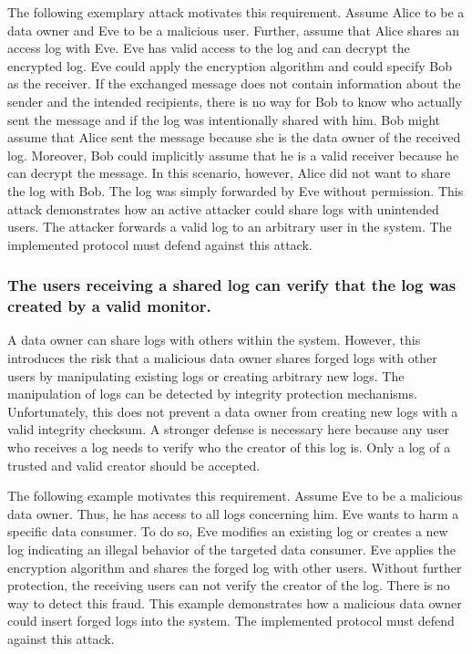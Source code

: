 \documentclass[../main.tex]{subfiles}
\begin{document}
The following exemplary attack motivates this requirement.
Assume Alice to be a data owner and Eve to be a malicious user.
Further, assume that Alice shares an access log with Eve.
Eve has valid access to the log and can decrypt the encrypted log.
Eve could apply the encryption algorithm and could specify Bob as the receiver.
If the exchanged message does not contain information about the sender and the intended recipients, there is no way for Bob to know who actually sent the message and if the log was intentionally shared with him.
Bob might assume that Alice sent the message because she is the data owner of the received log.
Moreover, Bob could implicitly assume that he is a valid receiver because he can decrypt the message.
In this scenario, however, Alice did not want to share the log with Bob.
The log was simply forwarded by Eve without permission.
This attack demonstrates how an active attacker could share logs with unintended users.
The attacker forwards a valid log to an arbitrary user in the system.
The implemented protocol must defend against this attack.

\subsubsection{The users receiving a shared log can verify that the log was created by a valid monitor.}

A data owner can share logs with others within the system.
However, this introduces the risk that a malicious data owner shares forged logs with other users by manipulating existing logs or creating arbitrary new logs.
The manipulation of logs can be detected by integrity protection mechanisms.
Unfortunately, this does not prevent a data owner from creating new logs with a valid integrity checksum.
A stronger defense is necessary here because any user who receives a log needs to verify who the creator of this log is.
Only a log of a trusted and valid creator should be accepted.

The following example motivates this requirement.
Assume Eve to be a malicious data owner.
Thus, he has access to all logs concerning him.
Eve wants to harm a specific data consumer.
To do so, Eve modifies an existing log or creates a new log indicating an illegal behavior of the targeted data consumer.
Eve applies the encryption algorithm and shares the forged log with other users.
Without further protection, the receiving users can not verify the creator of the log.
There is no way to detect this fraud.
This example demonstrates how a malicious data owner could insert forged logs into the system.
The implemented protocol must defend against this attack.
\end{document}
